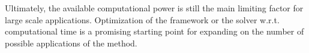 Ultimately, the available computational power is still the main limiting factor for large scale applications. Optimization of the framework or the solver w.r.t. computational time is a promising starting point for expanding on the number of possible applications of the method. 






















